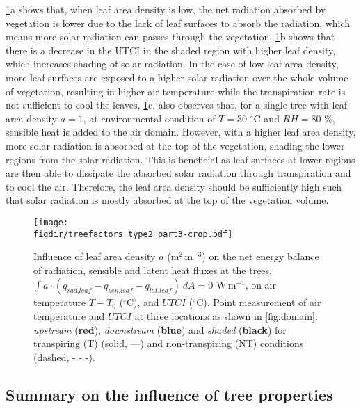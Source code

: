 \cref{fig:treefactorspart3}a shows that, when leaf area density is low, the net radiation absorbed by vegetation is lower due to the lack of leaf surfaces to absorb the radiation, which means more solar radiation can passes through the vegetation. \cref{fig:treefactorspart3}b shows that there is a decrease in the UTCI in the shaded region with higher leaf density, which increases shading of solar radiation. In the case of low leaf area density, more leaf surfaces are exposed to a higher solar radiation over the whole volume of vegetation, resulting in higher air temperature while the transpiration rate is not sufficient to cool the leaves, \cref{fig:treefactorspart3}c. \cite{Hiraoka2005} also observes that, for a single tree with leaf area density $a=1$, at environmental condition of $T=30$ $^{\circ}$C and $\textit{RH}=80$ \%, sensible heat is added to the air domain. However, with a higher leaf area density, more solar radiation is absorbed at the top of the vegetation, shading the lower regions from the solar radiation. This is beneficial as leaf surfaces at lower regions are then able to dissipate the absorbed solar radiation through transpiration and to cool the air. Therefore, the leaf area density should be sufficiently high such that solar radiation is mostly absorbed at the top of the vegetation volume. 

	\begin{figure}[t]
	\centering
	\texttt{[image: \\figdir/treefactors\_type2\_part3-crop.pdf]}
	\caption{Influence of leaf area density $a$ (m$^{2}$\,m$^{-3}$) on  the net energy balance of radiation, sensible and latent heat fluxes at the trees, $\int a \cdot (q_{\textit{rad,leaf}}-q_{\textit{sen,leaf}}-q_{\textit{lat,leaf}})\ dA = 0$ W\,m$^{-1}$,  on air temperature $T-T_0$ ($^{\circ}$C), and  $\textit{UTCI}$ ($^{\circ}$C). Point measurement of air temperature and $UTCI$ at three locations as shown in \cref{fig:domain}: \textit{upstream} ({\color{flatuidarkred}\textbf{red}}), \textit{downstream} ({\color{flatuidarkblue}\textbf{blue}}) and \textit{shaded} (\textbf{black}) for transpiring (T) (solid, ---) and non-transpiring (NT) conditions (dashed, - - -).}
	\label{fig:treefactorspart3}
	\end{figure}

\subsection{Summary on the influence of tree properties}

